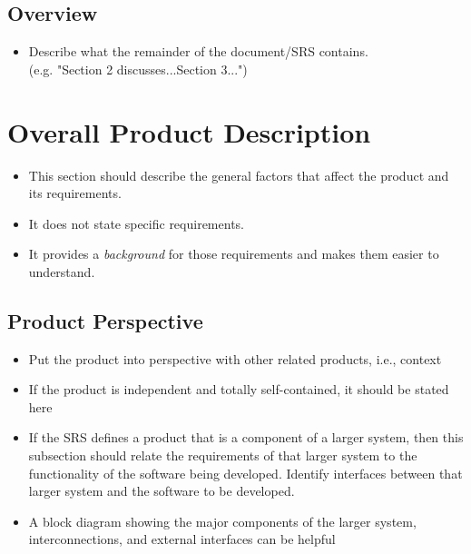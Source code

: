\documentclass[]{article}
\begin{document}
\subsection{Overview}
\label{sub:overview}
\begin{itemize}
	\item Describe what the remainder of the document/SRS contains.\\
	(e.g. "Section 2 discusses...Section 3...")
\end{itemize}


\section{Overall Product Description}
\label{sec:overall_description}

\begin{itemize}
	\item This section should describe the general factors that affect the product and its requirements. 
	\item It does not state specific requirements.
	\item It provides a \emph{background} for those requirements and makes them easier to understand.
\end{itemize}


\subsection{Product Perspective}
\label{sub:product_perspective}
\begin{itemize}
	\item Put the product into perspective with other related products, i.e., context
	\item If the product is independent and totally self-contained, it should be stated here
	\item If the SRS defines a product that is a component of a larger system, then this subsection should relate the requirements of that larger system to the functionality of the software being developed. Identify interfaces between that larger system and the software to be developed.
	\item A block diagram showing the major components of the larger system, interconnections, and external interfaces can be helpful
\end{itemize}
\end{document}
